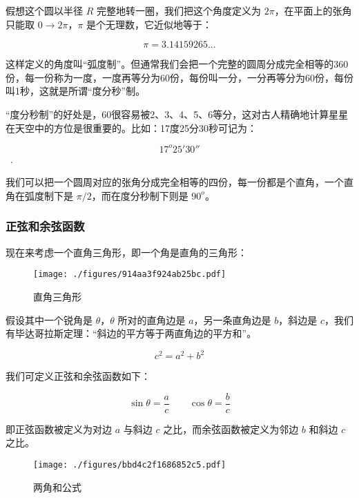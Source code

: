假想这个圆以半径 $R$ 完整地转一圈，我们把这个角度定义为 $2 \pi$，在平面上的张角只能取 $0 \to 2 \pi$，$\pi$ 是个无理数，它近似地等于：

\begin{equation}
\pi = 3.14159265 ...
\end{equation}

这样定义的角度叫“弧度制”。但通常我们会把一个完整的圆周分成完全相等的360份，每一份称为一度，一度再等分为60份，每份叫一分，一分再等分为60份，每份叫1秒，这就是所谓“度分秒”制。

“度分秒制”的好处是，60很容易被2、3、4、5、6等分，这对古人精确地计算星星在天空中的方位是很重要的。比如：17度25分30秒可记为：

\begin{equation}
17^o 25' 30''
\end{equation}~.

我们可以把一个圆周对应的张角分成完全相等的四份，每一份都是个直角，一个直角在弧度制下是 $\pi/2$，而在度分秒制下则是 $90^o$。

\subsubsection{正弦和余弦函数}

现在来考虑一个直角三角形，即一个角是直角的三角形：

\begin{figure}[ht]
\centering
\texttt{[image: ./figures/914aa3f924ab25bc.pdf]}
\caption{直角三角形} \label{fig_AtomId_4}
\end{figure}

假设其中一个锐角是 $\theta$，$\theta$ 所对的直角边是 $a$，另一条直角边是 $b$，斜边是 $c$，我们有毕达哥拉斯定理：“斜边的平方等于两直角边的平方和”。

\begin{equation}
c^2 = a^2 + b^2
\end{equation}

我们可定义正弦和余弦函数如下：

\begin{equation}
\sin \theta = \frac{a}{c} \qquad
\cos \theta = \frac{b}{c}
\end{equation}

即正弦函数被定义为对边 $a$ 与斜边 $c$ 之比，而余弦函数被定义为邻边 $b$ 和斜边 $c$ 之比。

\begin{figure}[ht]
\centering
\texttt{[image: ./figures/bbd4c2f1686852c5.pdf]}
\caption{两角和公式} \label{fig_AtomId_5}
\end{figure}

